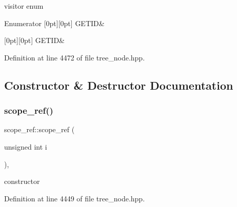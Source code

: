 visitor enum 

\begin{DoxyEnumFields}{Enumerator}
[0pt][0pt]{}\mbox{\label{structscope__ref_aa93f4d3dc24c061ec33661afc980402aac9a60e96d22d3ba0bcf73e6bc0891e9a}} 
G\+E\+T\+ID&\\
\hline

[0pt][0pt]{}\mbox{\label{structscope__ref_aa93f4d3dc24c061ec33661afc980402aac9a60e96d22d3ba0bcf73e6bc0891e9a}} 
G\+E\+T\+ID&\\
\hline

\end{DoxyEnumFields}


Definition at line 4472 of file tree\+\_\+node.\+hpp.



\subsection{Constructor \& Destructor Documentation}
\mbox{\label{structscope__ref_a1d9b96a3fcf6fcc4134ba46be547eeb7}} 
\subsubsection{\texorpdfstring{scope\+\_\+ref()}{scope\_ref()}}
{\footnotesize\ttfamily scope\+\_\+ref\+::scope\+\_\+ref (\begin{DoxyParamCaption}\item[{unsigned int}]{i }\end{DoxyParamCaption})\hspace{0.3cm}{\ttfamily [inline]}, {\ttfamily [explicit]}}



constructor 



Definition at line 4449 of file tree\+\_\+node.\+hpp.



